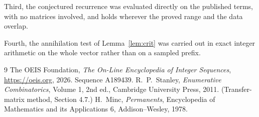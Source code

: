 \documentclass[11pt,a4paper]{article}
\theoremstyle{plain}
\theoremstyle{definition}
\begin{document}
Third, the conjectured recurrence was evaluated directly on the published terms, with no
matrices involved, and holds wherever the proved range and the data overlap.

Fourth, the annihilation test of Lemma~\ref{lem:crit} was carried out in exact integer
arithmetic on the whole vector rather than on a sampled prefix.

\begin{thebibliography}{9}
 The OEIS Foundation, \emph{The On-Line Encyclopedia of Integer
Sequences}, \url{https://oeis.org}, 2026. Sequence A189439.
 R.~P.~Stanley, \emph{Enumerative Combinatorics}, Volume 1, 2nd ed.,
Cambridge University Press, 2011. (Transfer-matrix method, Section 4.7.)
 H.~Minc, \emph{Permanents}, Encyclopedia of Mathematics and its
Applications 6, Addison--Wesley, 1978.
\end{thebibliography}
\end{document}
